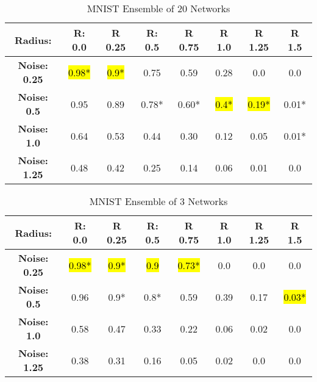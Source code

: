 \documentclass{article}
\begin{document}
\begin{table}[htb]
    \centering
    \begin{tabular}{|c|c|c|c|c|c|c|c|} \hline 
        
        \textbf{Radius: } & \textbf{R: 0.0} & \textbf{R 0.25} & \textbf{R: 0.5} & \textbf{R 0.75} & \textbf{R 1.0} & \textbf{R 1.25} & \textbf{R 1.5}  \\ \hline 
        
        \textbf{Noise: 0.25} & \hl{0.98*} & \hl{0.9*} & 0.75 & 0.59 & 0.28 & 0.0 & 0.0 \\ \hline 
        
        \textbf{Noise: 0.5} & 0.95 & 0.89 & 0.78* & 0.60* & \hl{0.4*} & \hl{0.19*} & 0.01* \\ \hline

        \textbf{Noise: 1.0} & 0.64 & 0.53 & 0.44 & 0.30 & 0.12 & 0.05 & 0.01* \\ \hline

        \textbf{Noise: 1.25} & 0.48 & 0.42 & 0.25 & 0.14 & 0.06 & 0.01 & 0.0 \\ \hline
        
    \end{tabular}
    \caption{MNIST Ensemble of 20 Networks}
    \label{tab:example}
\end{table}

\begin{table}[htb]
    \centering
    \begin{tabular}{|c|c|c|c|c|c|c|c|} \hline 
        
        \textbf{Radius: } & \textbf{R: 0.0} & \textbf{R 0.25} & \textbf{R: 0.5} & \textbf{R 0.75} & \textbf{R 1.0} & \textbf{R 1.25} & \textbf{R 1.5}  \\ \hline 
        
        \textbf{Noise: 0.25} & \hl{0.98*} & \hl{0.9*} & \hl{0.9} & \hl{0.73*} & 0.0 & 0.0 & 0.0 \\ \hline 
        
        \textbf{Noise: 0.5} & 0.96 & 0.9* & 0.8* & 0.59 & 0.39 & 0.17 & \hl{0.03*} \\ \hline

        \textbf{Noise: 1.0} & 0.58 & 0.47 & 0.33 & 0.22 & 0.06 & 0.02 & 0.0 \\ \hline

        \textbf{Noise: 1.25} & 0.38 & 0.31 & 0.16 & 0.05 & 0.02 & 0.0 & 0.0 \\ \hline
        
    \end{tabular}
    \caption{MNIST Ensemble of 3 Networks}
    \label{tab:example}
\end{table}
\end{document}
